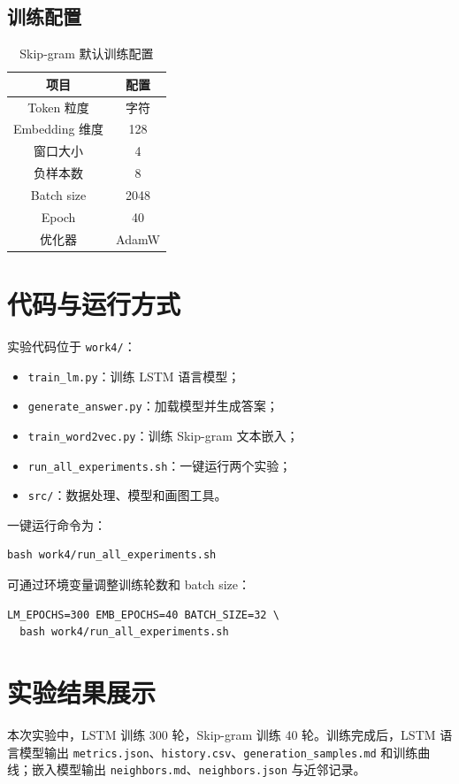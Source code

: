 \documentclass[a4paper,10pt,twocolumn]{article}
\begin{document}
\subsection{训练配置}
\begin{table}[H]
\centering
\small
\caption{Skip-gram 默认训练配置}
\begin{tabular}{c|c}
\toprule
项目 & 配置 \\
\midrule
Token 粒度 & 字符 \\
Embedding 维度 & 128 \\
窗口大小 & 4 \\
负样本数 & 8 \\
Batch size & 2048 \\
Epoch & 40 \\
优化器 & AdamW \\
\bottomrule
\end{tabular}
\end{table}

\section{代码与运行方式}
实验代码位于 \texttt{work4/}：
\begin{itemize}
  \item \texttt{train\_lm.py}：训练 LSTM 语言模型；
  \item \texttt{generate\_answer.py}：加载模型并生成答案；
  \item \texttt{train\_word2vec.py}：训练 Skip-gram 文本嵌入；
  \item \texttt{run\_all\_experiments.sh}：一键运行两个实验；
  \item \texttt{src/}：数据处理、模型和画图工具。
\end{itemize}

一键运行命令为：
\begin{verbatim}
bash work4/run_all_experiments.sh
\end{verbatim}
可通过环境变量调整训练轮数和 batch size：
\begin{verbatim}
LM_EPOCHS=300 EMB_EPOCHS=40 BATCH_SIZE=32 \
  bash work4/run_all_experiments.sh
\end{verbatim}

\section{实验结果展示}
本次实验中，LSTM 训练 300 轮，Skip-gram 训练 40 轮。训练完成后，LSTM 语言模型输出 \texttt{metrics.json}、\texttt{history.csv}、\texttt{generation\_samples.md} 和训练曲线；嵌入模型输出 \texttt{neighbors.md}、\texttt{neighbors.json} 与近邻记录。
\end{document}

